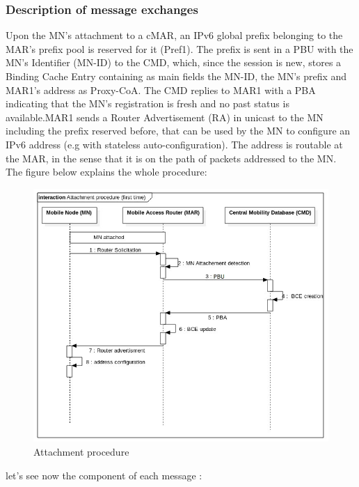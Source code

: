 \documentclass{article}
\begin{document}
\subsubsection{Description of message exchanges}
Upon the MN's attachment to a cMAR, an IPv6 global prefix belonging to
the MAR's prefix pool is reserved for it (Pref1).  The prefix is sent
in a PBU with the MN's Identifier (MN-ID) to the CMD, which, since the
session is new, stores a Binding Cache Entry containing as main fields
the MN-ID, the MN's prefix and MAR1's address as Proxy-CoA. The CMD
replies to MAR1 with a PBA indicating that the MN's registration is
fresh and no past status is available.MAR1 sends a Router
Advertisement (RA) in unicast to the MN including the prefix reserved
before, that can be used by the MN to configure an IPv6 address (e.g
with stateless auto-configuration). The address is routable at the
MAR, in the sense that it is on the path of packets addressed to the
MN.\\
\newline
The figure below explains the whole procedure:

\begin{figure}[h!]
  \centering
    \includegraphics[scale=0.5]{reportPictures/figure7.jpg}
  \caption{Attachment procedure}
\end{figure}

let's see now the component of each message : \\
\newline
\end{document}
